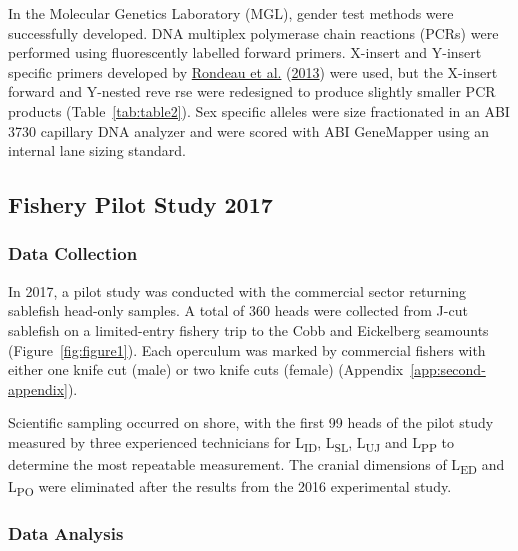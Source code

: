 \documentclass[12pt]{article}\usepackage[]{graphicx}\usepackage[]{color}
\begin{document}
In the Molecular Genetics Laboratory (MGL), gender test methods were successfully developed. DNA multiplex polymerase chain reactions (PCRs) were performed using fluorescently labelled forward primers. X-insert and Y-insert specific primers developed by \protect\hyperlink{ref-Rondeau2013}{Rondeau et al.} (\protect\hyperlink{ref-Rondeau2013}{2013}) were used, but the X-insert forward and Y-nested reve rse were redesigned to produce slightly smaller PCR products (Table~\ref{tab:table2}). Sex specific alleles were size fractionated in an ABI 3730 capillary DNA analyzer and were scored with ABI GeneMapper using an internal lane sizing standard.

\hypertarget{fishery-pilot-study-2017}{%
\subsection{Fishery Pilot Study 2017}\label{fishery-pilot-study-2017}}

\hypertarget{data-collection-1}{%
\subsubsection{Data Collection}\label{data-collection-1}}

In 2017, a pilot study was conducted with the commercial sector returning sablefish head-only samples. A total of 360 heads were collected from J-cut sablefish on a limited-entry fishery trip to the Cobb and Eickelberg seamounts (Figure~\ref{fig:figure1}). Each operculum was marked by commercial fishers with either one knife cut (male) or two knife cuts (female) (Appendix~\ref{app:second-appendix}).

Scientific sampling occurred on shore, with the first 99 heads of the pilot study measured by three experienced technicians for L\textsubscript{ID}, L\textsubscript{SL}, L\textsubscript{UJ} and L\textsubscript{PP} to determine the most repeatable measurement. The cranial dimensions of L\textsubscript{ED} and L\textsubscript{PO} were eliminated after the results from the 2016 experimental study.

\hypertarget{data-analysis-1}{%
\subsubsection{Data Analysis}\label{data-analysis-1}}
\end{document}
